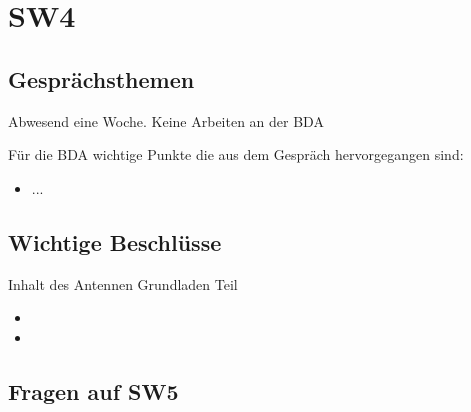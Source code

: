 \documentclass[10pt,a4paper]{article}
\begin{document}
\section*{SW4}

\subsection*{Gesprächsthemen}

Abwesend eine Woche. Keine Arbeiten an der BDA


\vspace{10 mm}
Für die BDA wichtige Punkte die aus dem Gespräch hervorgegangen sind:
\begin{itemize}
	\item ...

\end{itemize}

\subsection*{Wichtige Beschlüsse}
Inhalt des Antennen Grundladen Teil
\begin{itemize}
	\item 
	\item 

\end{itemize}

\subsection*{Fragen auf SW5}
\end{document}
